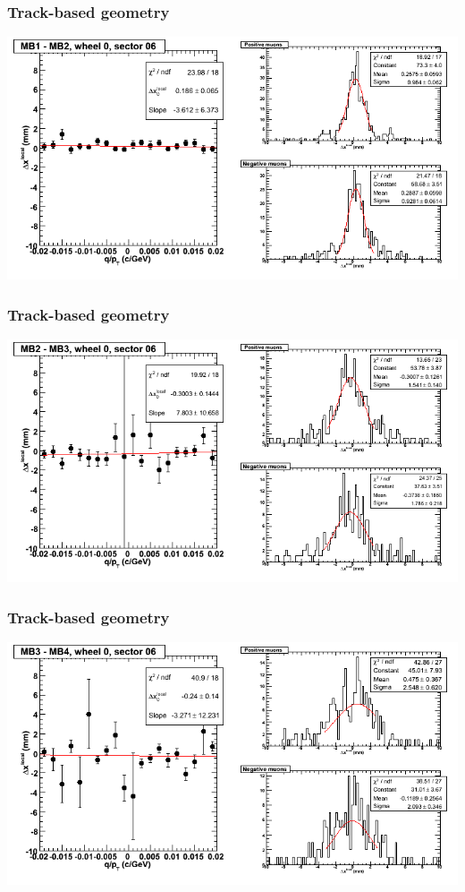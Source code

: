 \documentclass[compress]{beamer}
\begin{document}
\begin{frame}
\frametitle{Track-based geometry}
\includegraphics[width=\linewidth]{NOV4_segdiffs/dt13_resid_C_06_12.png}
\end{frame}

\begin{frame}
\frametitle{Track-based geometry}
\includegraphics[width=\linewidth]{NOV4_segdiffs/dt13_resid_C_06_23.png}
\end{frame}

\begin{frame}
\frametitle{Track-based geometry}
\includegraphics[width=\linewidth]{NOV4_segdiffs/dt13_resid_C_06_34.png}
\end{frame}
\end{document}
